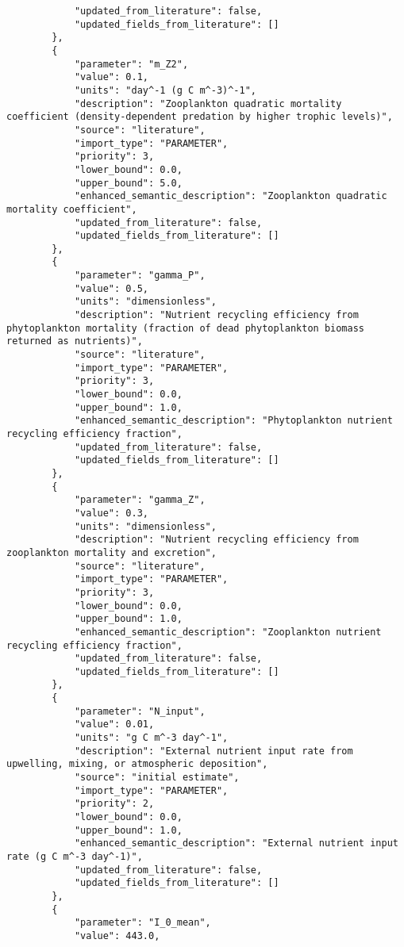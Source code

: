 \begin{lstlisting}
            "updated_from_literature": false,
            "updated_fields_from_literature": []
        },
        {
            "parameter": "m_Z2",
            "value": 0.1,
            "units": "day^-1 (g C m^-3)^-1",
            "description": "Zooplankton quadratic mortality coefficient (density-dependent predation by higher trophic levels)",
            "source": "literature",
            "import_type": "PARAMETER",
            "priority": 3,
            "lower_bound": 0.0,
            "upper_bound": 5.0,
            "enhanced_semantic_description": "Zooplankton quadratic mortality coefficient",
            "updated_from_literature": false,
            "updated_fields_from_literature": []
        },
        {
            "parameter": "gamma_P",
            "value": 0.5,
            "units": "dimensionless",
            "description": "Nutrient recycling efficiency from phytoplankton mortality (fraction of dead phytoplankton biomass returned as nutrients)",
            "source": "literature",
            "import_type": "PARAMETER",
            "priority": 3,
            "lower_bound": 0.0,
            "upper_bound": 1.0,
            "enhanced_semantic_description": "Phytoplankton nutrient recycling efficiency fraction",
            "updated_from_literature": false,
            "updated_fields_from_literature": []
        },
        {
            "parameter": "gamma_Z",
            "value": 0.3,
            "units": "dimensionless",
            "description": "Nutrient recycling efficiency from zooplankton mortality and excretion",
            "source": "literature",
            "import_type": "PARAMETER",
            "priority": 3,
            "lower_bound": 0.0,
            "upper_bound": 1.0,
            "enhanced_semantic_description": "Zooplankton nutrient recycling efficiency fraction",
            "updated_from_literature": false,
            "updated_fields_from_literature": []
        },
        {
            "parameter": "N_input",
            "value": 0.01,
            "units": "g C m^-3 day^-1",
            "description": "External nutrient input rate from upwelling, mixing, or atmospheric deposition",
            "source": "initial estimate",
            "import_type": "PARAMETER",
            "priority": 2,
            "lower_bound": 0.0,
            "upper_bound": 1.0,
            "enhanced_semantic_description": "External nutrient input rate (g C m^-3 day^-1)",
            "updated_from_literature": false,
            "updated_fields_from_literature": []
        },
        {
            "parameter": "I_0_mean",
            "value": 443.0,

\end{lstlisting}
